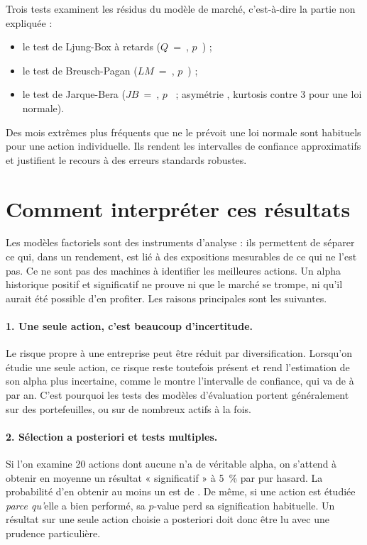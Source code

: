 \documentclass[11pt,a4paper]{article}
\begin{document}
Trois tests examinent les résidus du modèle de marché, c'est-à-dire la partie non expliquée :
\begin{itemize}[leftmargin=*]
  \item le test de Ljung-Box à \LBLags{} retards \LBVerdict{} (\mbox{$Q$ = \LBQ}, \mbox{$p$~\LBpEq}) ;
  \item le test de Breusch-Pagan \BPVerdict{} (\mbox{$LM$ = \BPLM}, \mbox{$p$~\BPpEq}) ;
  \item le test de Jarque-Bera \JBVerdict{} (\mbox{$JB$ = \JB}, \mbox{$p$~\JBpEq} ; asymétrie \Asym, kurtosis \Kurt{} contre 3 pour une loi normale).
\end{itemize}
Des mois extrêmes plus fréquents que ne le prévoit une loi normale sont habituels pour une action individuelle. Ils rendent les intervalles de confiance approximatifs et justifient le recours à des erreurs standards robustes.

\section{Comment interpréter ces résultats}
\label{sec:limites}

Les modèles factoriels sont des instruments d'analyse : ils permettent de séparer ce qui, dans un rendement, est lié à des expositions mesurables de ce qui ne l'est pas. Ce ne sont pas des machines à identifier les meilleures actions. Un alpha historique positif et significatif ne prouve ni que le marché se trompe, ni qu'il aurait été possible d'en profiter. Les raisons principales sont les suivantes.

\paragraph{1. Une seule action, c'est beaucoup d'incertitude.} Le risque propre à une entreprise peut être réduit par diversification. Lorsqu'on étudie une seule action, ce risque reste toutefois présent et rend l'estimation de son alpha plus incertaine, comme le montre l'intervalle de confiance, qui va de \AlphaALo{} à \AlphaAHi{} par an. C'est pourquoi les tests des modèles d'évaluation portent généralement sur des portefeuilles, ou sur de nombreux actifs à la fois.

\paragraph{2. Sélection a posteriori et tests multiples.} Si l'on examine 20 actions dont aucune n'a de véritable alpha, on s'attend à obtenir en moyenne un résultat « significatif » à 5~\% par pur hasard. La probabilité d'en obtenir au moins un est de \ProbUnFaux. De même, si une action est étudiée \emph{parce qu'}elle a bien performé, sa $p$-value perd sa signification habituelle. Un résultat sur une seule action choisie a posteriori doit donc être lu avec une prudence particulière.
\end{document}
